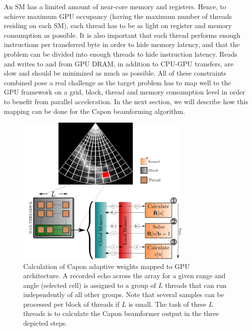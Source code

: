 \documentclass[journal]{IEEEtran}
\begin{document}
An SM has a limited amount of near-core memory and registers. Hence, to achieve maximum GPU occupancy (having the maximum number of threads residing on each SM), each thread has to be as light on register and memory consumption as possible. It is also important that each thread performs enough instructions per transferred byte in order to hide memory latency, and that the problem can be divided into enough threads to hide instruction latency. Reads and writes to and from GPU DRAM, in addition to CPU-GPU transfers, are slow and should be minimized as much as possible. All of these constraints combined pose a real challenge as the target problem has to map well to the GPU framework on a grid, block, thread and memory consumption level in order to benefit from parallel acceleration. In the next section, we will describe how this mapping can be done for the Capon beamforming algorithm.    

\begin{figure}
\centerline{\includegraphics[width=3.4in]{gfx/gpu_layout_vertical_lr.png}}
\caption{Calculation of Capon adaptive weights mapped to GPU architecture. A recorded echo across the array for a given range and angle (selected cell) is assigned to a group of $L$ threads that can run independently of all other groups. Note that several samples can be processed per block of threads if $L$ is small. The task of these $L$ threads is to calculate the Capon beamformer output in the three depicted steps.}
\label{fig:gpulayout}
\end{figure}

\end{document}
